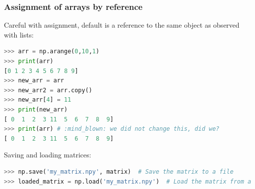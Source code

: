 \begin{frame}[fragile]
  \frametitle{Assignment of arrays by reference}
  Careful with assignment, default is a reference to the same object as observed with lists:
  \begin{lstlisting}[language=Python, numbers=none]
>>> arr = np.arange(0,10,1)
>>> print(arr)
[0 1 2 3 4 5 6 7 8 9]
>>> new_arr = arr 
>>> new_arr2 = arr.copy()
>>> new_arr[4] = 11
>>> print(new_arr)
[ 0  1  2  3 11  5  6  7  8  9]
>>> print(arr) # :mind_blown: we did not change this, did we?
[ 0  1  2  3 11  5  6  7  8  9]
  \end{lstlisting}\pause

  Saving and loading matrices:
  \begin{lstlisting}[language=Python, numbers=none]
>>> np.save('my_matrix.npy', matrix)  # Save the matrix to a file
>>> loaded_matrix = np.load('my_matrix.npy')  # Load the matrix from a file
  \end{lstlisting}
\end{frame}




  
  
